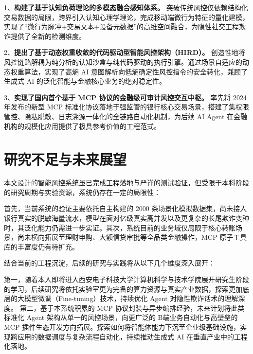 \documentclass{xduugthesis}
\begin{document}
1、\textbf{构建了基于认知负荷理论的多模态融合感知体系。} 突破传统风控仅依赖结构化交易数据的局限，跨界引入认知心理学理论，完成移动端微行为特征的量化建模，实现了“微行为脉冲+交易文本+设备元数据”的高维空间融合，为隐性社交工程欺诈提供了全新的检测维度。

2、\textbf{提出了基于动态权重收敛的代码驱动型智能风控架构（HIRD）。} 创造性地将风控链路解耦为纯分析的认知沙盒与纯代码驱动的执行引擎。通过场景自适应的动态权重算法，实现了高熵 AI 意图解析向低熵确定性风控指令的安全转化，兼顾了生成式 AI 的泛化智能与金融核心业务的绝对稳定性。

3、\textbf{实现了国内首个基于 MCP 协议的金融级可审计风控交互中枢。} 率先将 2024 年发布的新型 MCP 标准化协议落地于强监管的银行核心交易场景，搭建了集权限管控、隐私脱敏、日志溯源一体化的全链路自动化机制，为后续 AI Agent 在金融机构的规模化应用提供了极具参考价值的工程范式。

\section{研究不足与未来展望}

本文设计的智能风控系统虽已完成工程落地与严谨的测试验证，但受限于本科阶段的研究周期与实验资源，系统仍存在一定的局限性：

首先，当前系统的验证主要依托自主构建的 2000 条场景化模拟数据集，尚未接入银行真实的脱敏海量流水，模型在面对亿级真实高并发以及更复杂的长尾欺诈变种时，其泛化能力仍需进一步实证。其次，系统目前的业务域仅局限于核心转账场景，尚未横向拓展至理财申购、大额信贷审批等全品类金融操作，MCP 原子工具库的丰富度仍有待扩充。

结合当前的工程沉淀，后续的研究与实践将从以下几个维度深入展开：

第一，随着本人即将进入西安电子科技大学计算机科学与技术学院展开研究生阶段的学习，后续研究将依托实验室更为完备的算力资源与真实产业数据，探索更加底层的大模型微调（Fine-tuning）技术，持续优化 Agent 对隐性欺诈话术的理解深度。
第二，基于本系统积累的 MCP 协议封装与异步编排经验，未来计划将此类标准化 Agent 架构从单一的风控场景，向更广泛的 B端业务自动化与高壁垒的 MCP 插件生态开发方向拓展。探索如何将智能体能力下沉至企业级基础设施，实现跨应用的数据调度与复杂流程自动化，持续推动生成式 AI 在垂直产业中的工程化落地。
\end{document}
